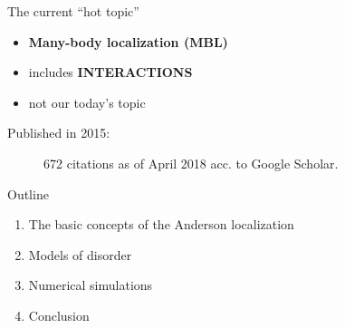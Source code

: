 \documentclass[1pt]{beamer}
\begin{document}
\begin{frame}{The current ``hot topic''}
\begin{minipage}[c]{0.38\textwidth}
\begin{itemize}
\item \textbf{Many-body localization (MBL)}
\vspace{10mm}
\item includes \textbf{INTERACTIONS}
\vspace{10mm}
\item not our today's topic

\end{itemize}
\end{minipage}
\begin{minipage}[c]{0.6\textwidth}
Published in 2015:
\begin{figure}
\caption{672 citations as of April 2018 acc. to Google Scholar.}
\end{figure}
\end{minipage}
\end{frame}

\begin{frame}{Outline}

\begin{enumerate}
\item The basic concepts of the Anderson localization
\vspace{10mm}
\item Models of disorder
\vspace{10mm}
\item Numerical simulations
\vspace{10mm}
\item Conclusion
\end{enumerate}


\end{frame}
\end{document}
